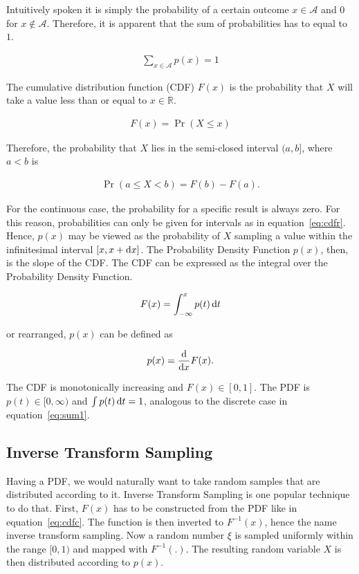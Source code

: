 Intuitively spoken it is simply the probability of a certain outcome $x \in \mathcal{A}$ and $0$ for $x \notin \mathcal{A}$. Therefore, it is apparent that the sum of probabilities has to equal to $1$.

\begin{align}
\label{eq:sum1}
\sum_{x\in\mathcal{A}}p(x) = 1
\end{align}

The cumulative distribution function (CDF) $F(x)$ is the probability that $X$ will take a value less than or equal to $x \in \mathbb{R}$.

\begin{align}
 F(x) = \Pr(X \leq x)
\end{align}

Therefore, the probability that $X$ lies in the semi-closed interval $(a, b]$, where $a < b$ is  

\begin{align}
\label{eq:cdfr}
 \Pr(a \leq X < b) = F(b) - F(a).
\end{align}

For the continuous case, the probability for a specific result is always zero. For this reason, probabilities can only be given for intervals as in equation~\ref{eq:cdfr}. Hence, $p(x)$ may be viewed as the probability of $X$ sampling a value within the infinitesimal interval $[x, x + \mathop{}\!\mathrm{d} x]$. The Probability Density Function $p(x)$, then, is the slope of the CDF. The CDF can be expressed as the integral over the Probability Density Function.

\begin{align}
\label{eq:cdfc}
 F(x) = \int_{-\infty}^{x}p(t)\mathop{}\!\mathrm{d} t
\end{align}

or rearranged, $p(x)$ can be defined as

\begin{align}
 p(x) = \frac{\mathop{}\!\mathrm{d}}{\mathop{}\!\mathrm{d} x} F(x).
\end{align}

The CDF is monotonically increasing and $F(x) \in [0,1]$. The PDF is $p(t) \in [0, \infty)$ and $\int p(t)\mathop{}\!\mathrm{d} t = 1$, analogous to the discrete case in equation~\ref{eq:sum1}. 

\subsection{Inverse Transform Sampling}

Having a PDF, we would naturally want to take random samples that are distributed according to it. Inverse Transform Sampling is one popular technique to do that. First, $F(x)$ has to be constructed from the PDF like in equation~\ref{eq:cdfc}. The function is then inverted to $F^{-1}(x)$, hence the name inverse transform sampling. Now a random number $\xi$ is sampled uniformly within the range $[0, 1)$ and mapped with $F^{-1}(.)$. The resulting random variable $X$ is then distributed according to $p(x)$.


